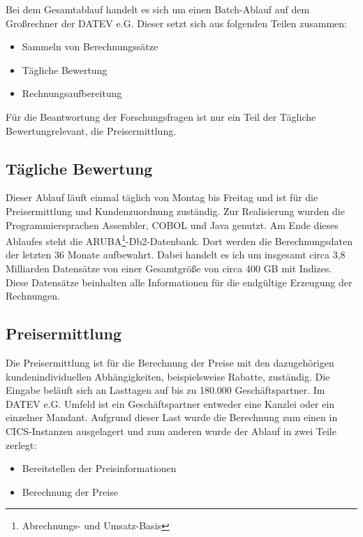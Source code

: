 Bei dem Gesamtablauf handelt es sich um einen Batch-Ablauf auf dem Großrechner der DATEV e.G.
Dieser setzt sich aus folgenden Teilen zusammen:
\begin{itemize}
\item Sammeln von Berechnungssätze
\item Tägliche Bewertung
\item Rechnungsaufbereitung
\end{itemize}
Für die Beantwortung der Forschungsfragen ist nur ein Teil der \glqq Tägliche Bewertung\grqq relevant, die Preisermittlung.

\subsection{Tägliche Bewertung}\label{sssec:täglbew}
Dieser Ablauf läuft einmal täglich von Montag bis Freitag und ist für die Preisermittlung und Kundenzuordnung zuständig.
Zur Realisierung wurden die Programmiersprachen Assembler, COBOL und Java genutzt.
Am Ende dieses Ablaufes steht die ARUBA\footnote{Abrechnungs- und Umsatz-Basis}-Db2-Datenbank.
Dort werden die Berechnungsdaten der letzten 36 Monate aufbewahrt.
Dabei handelt es ich um insgesamt circa 3,8 Milliarden Datensätze von einer Gesamtgröße von circa 400 GB mit Indizes.
Diese Datensätze beinhalten alle Informationen für die endgültige Erzeugung der Rechnungen.

\subsection{Preisermittlung}\label{ssec:preis}
Die Preisermittlung ist für die Berechnung der Preise mit den dazugehörigen kundenindividuellen Abhängigkeiten, beispielsweise Rabatte, zuständig.
Die Eingabe beläuft sich an Lasttagen auf bis zu 180.000 Geschäftspartner.
Im DATEV e.G. Umfeld ist ein Geschäftspartner entweder eine Kanzlei oder ein einzelner Mandant.
Aufgrund dieser Last wurde die Berechnung zum einen in CICS-Instanzen ausgelagert und zum anderen wurde der Ablauf in zwei Teile zerlegt:
\begin{itemize}
\item Bereitstellen der Preisinformationen
\item Berechnung der Preise
\end{itemize}
